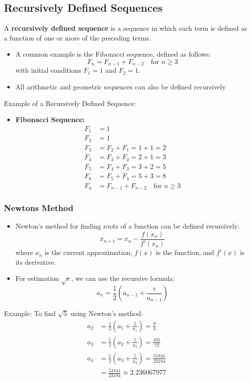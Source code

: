 \subsection{Recursively Defined Sequences}
A \textbf{recursively defined sequence} is a sequence in which each term is defined as a function of one or more of the preceding terms.
\begin{itemize}
    \item A common example is the Fibonacci sequence, defined as follows:
    \[ F_n = F_{n-1} + F_{n-2} \quad \text{for } n \geq 3 \]
    with initial conditions \(F_1 = 1\) and \(F_2 = 1\).
    \item All arithmetic and geometric sequences can also be defined recursively
\end{itemize}
Example of a Recursively Defined Sequence:
\begin{itemize}
    \item \textbf{Fibonacci Sequence:}
    \begin{align*}
        F_1 &= 1 \\
        F_2 &= 1 \\
        F_3 &= F_2 + F_1 = 1 + 1 = 2 \\
        F_4 &= F_3 + F_2 = 2 + 1 = 3 \\
        F_5 &= F_4 + F_3 = 3 + 2 = 5 \\
        F_6 &= F_5 + F_4 = 5 + 3 = 8 \\
        F_n &= F_{n-1} + F_{n-2} \quad \text{for } n \geq 3
    \end{align*}
\end{itemize}

\subsubsection{Newtons Method}
\begin{itemize}
    \item Newton's method for finding roots of a function can be defined recursively:
    \[ x_{n+1} = x_n - \frac{f(x_n)}{f'(x_n)} \]
    where \(x_n\) is the current approximation, \(f(x)\) is the function, and \(f'(x)\) is its derivative.
    \item For estimation \(\sqrt{c}\), we can use the recursive formula:
    \[ a_{n} = \frac{1}{2}(a_{n-1} + \frac{c}{a_{n-1}}) \]
\end{itemize}
Example: To find \(\sqrt{5}\) using Newton's method:
\begin{align*}
    a_{2} &= \frac{1}{2}(a_{1} + \frac{5}{a_{1}}) = \frac{9}{4} \\
    a_{3} &= \frac{1}{2}(a_{2} + \frac{5}{a_{2}})  = \frac{161}{72} \\
    a_{4} &= \frac{1}{2}(a_{3} + \frac{5}{a_{3}}) = \frac{51841}{23184} \\
    &= \frac{51841}{23184} \approx 2.236067977
\end{align*}

